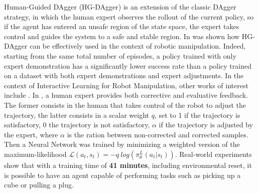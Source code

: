 \newline Human-Guided DAgger (HG-DAgger) \cite{kelly2019hg_dagger} is an extension of the classic DAgger strategy, in which the human expert observes the rollout of the current policy, so if the agent has entered an unsafe region of the state space, the expert takes control and guides the system to a safe and stable region. In \cite{jang2022bc_z} was shown how HG-DAgger can be effectively used in the context of robotic manipulation. Indeed, starting from the same total number of episodes, a policy trained with only expert demonstration has a significantly lower success rate than a policy trained on a dataset with both expert demonstrations and expert adjustments. In the context of Interactive Learning for Robot Manipulation, other works of interest include \cite{mandlekar2020human_in_the_loop,chisari2022correct}. In \cite{chisari2022correct}, a human expert provides both corrective and evaluative feedback. %
The former consists in the human that takes control of the robot to adjust the trajectory, the latter consists in a scalar weight $q$, set to 1 if the trajectory is satisfactory, 0 the trajectory is not satisfactory, $\alpha$ if the trajectory is adjusted by the expert, where $\alpha$ is the ration between non-corrected and corrected samples. Then a Neural Network %
was trained by minimizing a weighted version of the maximum-likelihood $\mathcal{L}(a_{t},s_{t}) = - q \ log(\pi^{L}_{\theta}(a_{t}|s_{t}))$. Real-world experiments show that with a training time of \textbf{41 minutes}, including environmental reset, it is possible to have an agent capable of performing tasks such as picking up a cube or pulling a plug.
%

